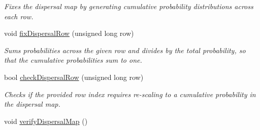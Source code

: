 \begin{DoxyCompactItemize}
\begin{DoxyCompactList}\small\item\em Fixes the dispersal map by generating cumulative probability distributions across each row. \end{DoxyCompactList}\item 
void \hyperlink{class_dispersal_coordinator_a7fc1c7f99cb2ac16ae97c78876eb69ab}{fix\+Dispersal\+Row} (unsigned long row)
\begin{DoxyCompactList}\small\item\em Sums probabilities across the given row and divides by the total probability, so that the cumulative probabilities sum to one. \end{DoxyCompactList}\item 
bool \hyperlink{class_dispersal_coordinator_a8e3c496ef1ad36844368bc9d2dd68757}{check\+Dispersal\+Row} (unsigned long row)
\begin{DoxyCompactList}\small\item\em Checks if the provided row index requires re-\/scaling to a cumulative probability in the dispersal map. \end{DoxyCompactList}\item 
void \hyperlink{class_dispersal_coordinator_a5f6d3782cf8b528d591d17c77072924a}{verify\+Dispersal\+Map} ()\hypertarget{class_dispersal_coordinator_a5f6d3782cf8b528d591d17c77072924a}{}\label{class_dispersal_coordinator_a5f6d3782cf8b528d591d17c77072924a}


\end{DoxyCompactItemize}
